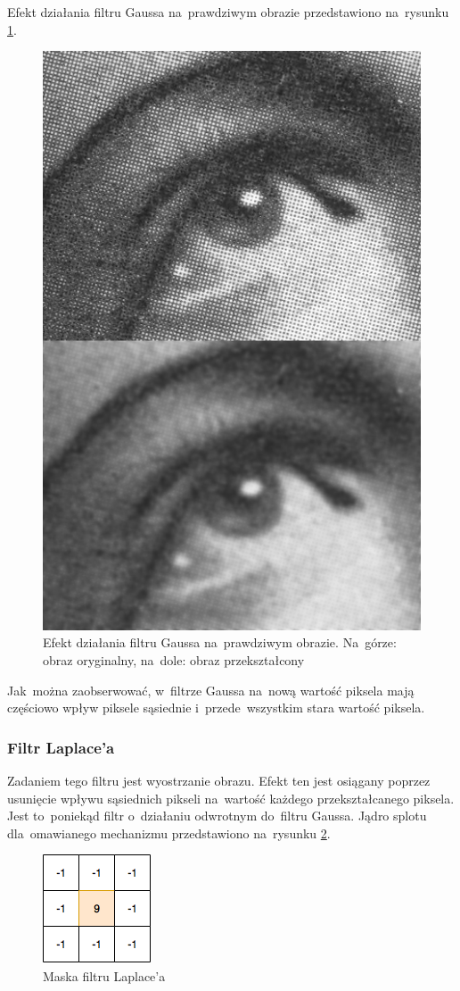 Efekt działania filtru Gaussa na~prawdziwym obrazie przedstawiono na~rysunku \ref{rys:gauss-conv-example}.
\begin{figure}[H]
	\centering
	\includegraphics[width=0.4\linewidth]{img/gauss-conv-real-example.jpg}
	\caption{Efekt działania filtru Gaussa na~prawdziwym obrazie. Na~górze: obraz oryginalny, na~dole: obraz
	przekształcony}
	\label{rys:gauss-conv-example}
\end{figure}

Jak~można zaobserwować, w~filtrze Gaussa na~nową wartość piksela mają częściowo wpływ piksele sąsiednie
i~przede~wszystkim stara wartość piksela.

\subsubsection{Filtr Laplace'a}
Zadaniem tego filtru jest wyostrzanie obrazu. Efekt ten jest osiągany poprzez usunięcie wpływu sąsiednich pikseli
na~wartość każdego przekształcanego piksela. Jest to~poniekąd filtr o~działaniu odwrotnym do~filtru Gaussa. Jądro splotu
dla~omawianego mechanizmu przedstawiono na~rysunku \ref{rys:maska-laplace}.

\begin{figure}[H]
	\centering
	\includegraphics[width=0.25\linewidth]{img/laplace-conv-kernel.png}
	\caption{Maska filtru Laplace'a}
	\label{rys:maska-laplace}
\end{figure}

